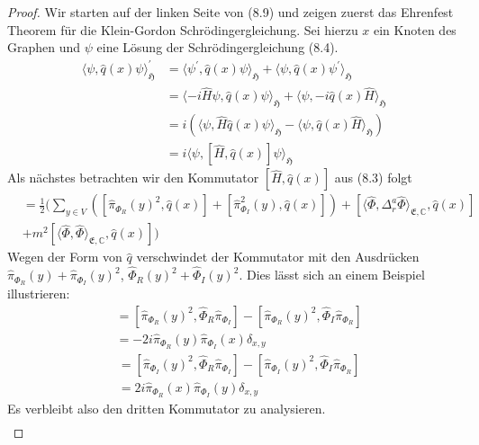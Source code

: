 \documentclass[11pt,a4paper,leqno]{report}
\numberwithin{equation}{chapter}
\begin{document}
\begin{proof}
	Wir starten auf der linken Seite von (8.9) und zeigen zuerst das Ehrenfest Theorem f\"ur die Klein-Gordon Schr\"odingergleichung. Sei hierzu $x$ ein Knoten des Graphen und $\psi$ eine L\"osung der Schr\"odingergleichung (8.4).
	\begin{align*}
		\langle \psi, \hat{q}(x)\psi\rangle_\mathfrak{H}^\prime &= \langle \psi^\prime, \hat{q}(x)\psi\rangle_\mathfrak{H} + \langle \psi, \hat{q}(x)\psi^\prime\rangle_\mathfrak{H}\\
		&= \langle -i\hat{H}\psi, \hat{q}(x)\psi\rangle_\mathfrak{H} + \langle \psi, -i\hat{q}(x)\hat{H}\rangle_\mathfrak{H}\\
		&= i(\langle \psi, \hat{H}\hat{q}(x)\psi\rangle_\mathfrak{H} - \langle \psi, \hat{q}(x)\hat{H}\rangle_\mathfrak{H})\\
		&=i\langle \psi, [\hat{H},\hat{q}(x)]\psi\rangle_\mathfrak{H} 
	\end{align*}
	Als n\"achstes betrachten wir den Kommutator $[\hat{H},\hat{q}(x)]$ aus (8.3) folgt
	\begin{align*}
		[\hat{H},\hat{q}(x)]&=\frac{1}{2}(\sum_{y\in V}([\hat{\pi}_{\Phi_R}(y)^2,\hat{q}(x)] + [\hat{\pi}_{\Phi_I}^2(y),\hat{q}(x)]) + [\langle \hat{\Phi}, \Delta^{a}_r\hat{\Phi}\rangle_{\mathfrak{E},\mathbb{C}},\hat{q}(x)]\\&+ m^2[\langle \hat{\Phi},\hat{\Phi}\rangle_{\mathfrak{E},\mathbb{C}},\hat{q}(x)])
	\end{align*}
	Wegen der Form von $\hat{q}$ verschwindet der Kommutator mit den Ausdr\"ucken $\hat{\pi}_{\Phi_R}(y) + \hat{\pi}_{\Phi_I}(y)^2$, $\hat{\Phi}_R(y)^2 + \hat{\Phi}_I(y)^2$. Dies l\"asst sich an einem Beispiel illustrieren:
	\begin{align*}
		[\hat{\pi}_{\Phi_R}(y)^2, \hat{q}(x)] &= [\hat{\pi}_{\Phi_R}(y)^2, \hat{\Phi}_R\hat{\pi}_{\Phi_I}]-[\hat{\pi}_{\Phi_R}(y)^2,\hat{\Phi}_I\hat{\pi}_{\Phi_R}]\\
		&= -2i\hat{\pi}_{\Phi_R}(y)\hat{\pi}_{\Phi_I}(x)\delta_{x,y}
	\end{align*}
	\begin{align*}
	[\hat{\pi}_{\Phi_I}(y)^2, \hat{q}(x)] &= [\hat{\pi}_{\Phi_I}(y)^2, \hat{\Phi}_R\hat{\pi}_{\Phi_I}]-[\hat{\pi}_{\Phi_I}(y)^2,\hat{\Phi}_I\hat{\pi}_{\Phi_R}]\\
	&= 2i\hat{\pi}_{\Phi_R}(x)\hat{\pi}_{\Phi_I}(y)\delta_{x,y}
\end{align*}
	Es verbleibt also den dritten Kommutator zu analysieren.
	\begin{align*}

\end{align*}
\end{proof}
\end{document}
